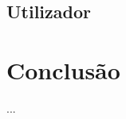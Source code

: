 \documentclass[a4paper]{report}
\begin{document}
\section{Utilizador}

\chapter{Conclusão}
...
\end{document}
